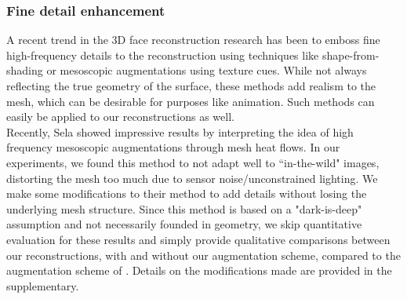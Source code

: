 \documentclass[10pt,twocolumn,letterpaper]{article}
\begin{document}
\subsubsection{Fine detail enhancement}
A recent trend in the 3D face reconstruction research has been to emboss fine high-frequency details to the reconstruction using techniques like shape-from-shading or mesoscopic augmentations using texture cues. While not always reflecting the true geometry of the surface, these methods add realism to the mesh, which can be desirable for purposes like animation. Such methods can easily be applied to our reconstructions as well.\\
Recently, Sela \etal\cite{sela2017unrestricted} showed impressive results by interpreting the idea of high frequency mesoscopic augmentations \cite{beeler2010high} through mesh heat flows. In our experiments, we found this method to not adapt well to ``in-the-wild" images, distorting the mesh too much due to sensor noise/unconstrained lighting. We make some modifications to their method to add details without losing the underlying mesh structure. 
Since this method is based on a "dark-is-deep" assumption and not necessarily founded in geometry, we skip quantitative evaluation for these results and simply provide qualitative comparisons between our reconstructions, with and without our augmentation scheme, compared to the augmentation scheme of \cite{sela2017unrestricted}. Details on the modifications made are provided in the supplementary.

\end{document}
